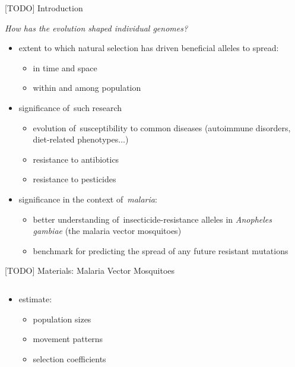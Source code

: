 \documentclass[final,hyperref={pdfpagelabels=false}]{beamer}
\begin{document}
\begin{frame}[t]
\begin{columns}[t]
\begin{column}{.465\textwidth}
\begin{block}{[TODO] Introduction}

\emph{How has the evolution shaped individual genomes?}

\begin{itemize}
\item extent to which natural selection has driven beneficial alleles to spread:
    \begin{itemize}
    \item in time and space
    \item within and among population
    \end{itemize}
\end{itemize}

\begin{itemize}
    \item significance of~such research
    \begin{itemize}
    	\item evolution of~susceptibility to common diseases (autoimmune disorders, diet-related phenotypes$\dots$)
    	\item resistance to antibiotics
    	\item resistance to pesticides
    \end{itemize}
\end{itemize}

\begin{itemize}
\item significance in the context of~\emph{malaria}:
    \begin{itemize}
	\item better understanding  of~insecticide-resistance alleles in \emph{Anopheles gambiae} (the malaria vector mosquitoes)
	\item benchmark for predicting the spread of any future resistant mutations
    \end{itemize}
\end{itemize}
\end{block}


\begin{block}{[TODO] Materials: Malaria Vector Mosquitoes}

\begin{columns} %
\begin{column}{.4\textwidth} %
\begin{itemize}
    \item estimate:
    \begin{itemize}
        \item population sizes
        \item movement patterns
        \item selection coefficients
    \end{itemize}
    

\end{itemize}
\end{column}
\end{columns}
\end{block}
\end{column}
\end{columns}
\end{frame}
\end{document}
